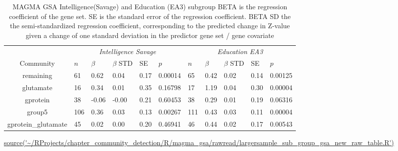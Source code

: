 \begin{table}[ht]
\centering
\setlength{\extrarowheight}{2pt}
\begin{tabular}{cllllllllll}
  \toprule
   &  \multicolumn{5}{c}{\textit{Intelligence Savage}} & \multicolumn{5}{c}{\textit{Education EA3}} \\
   
    \cmidrule{2-11}
    Community & $n$ & $\beta$ & $\beta$ STD & SE & $p$ & $n$ & $\beta$ & $\beta$ STD & SE & $p$\\ 
    \midrule
remaining & 61 & 0.62 & 0.04 & 0.17 & 0.00014 & 65 & 0.42 & 0.02 & 0.14 & 0.00125 \\ 
  glutamate & 16 & 0.34 & 0.01 & 0.35 & 0.16798 & 17 & 1.19 & 0.04 & 0.30 & 0.00004 \\ 
  gprotein & 38 & -0.06 & -0.00 & 0.21 & 0.60453 & 38 & 0.29 & 0.01 & 0.19 & 0.06316 \\ 
  group5 & 106 & 0.36 & 0.03 & 0.13 & 0.00267 & 111 & 0.43 & 0.03 & 0.11 & 0.00004 \\ 
  gprotein\_glutamate & 45 & 0.02 & 0.00 & 0.20 & 0.46941 & 46 & 0.44 & 0.02 & 0.17 & 0.00543 \\ 
   \bottomrule
\end{tabular}
\caption{MAGMA GSA Intelligence(Savage) and Education (EA3) subgroup  BETA is the regression coefficient of the gene set. SE is the standard error of the regression coefficient. BETA SD the the semi-standardized regression coefficient, corresponding to the predicted
change in Z-value given a change of one standard deviation in the predictor gene set / gene covariate } 
\tiny\url{source('~/RProjects/chapter_community_detection/R/magma_gsa/rawread/largersample_sub_group_gsa_new_raw_table.R')}
\label{tab:MAGMA GSA larger samples subgroup}
\end{table}





